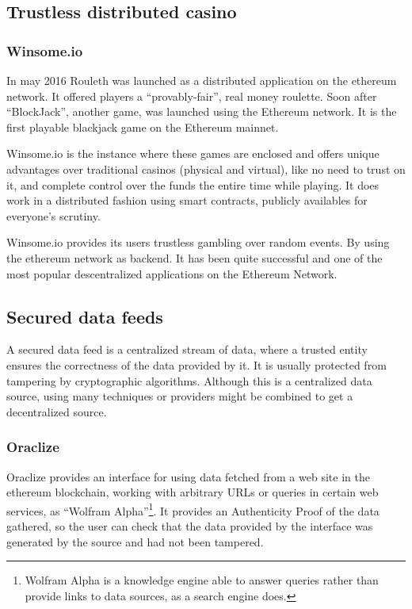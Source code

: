 \subsection{Trustless distributed casino}

\subsubsection{Winsome.io}
In may 2016 Rouleth \cite{winsomeio} was launched as a distributed application
  on the ethereum network.
It offered players a ``provably-fair'', real money roulette.
Soon after ``BlockJack'', another game,  was launched using the Ethereum
  network.
It is the first playable blackjack game on the Ethereum mainnet.

Winsome.io is the instance where these games are enclosed and offers unique
  advantages over traditional casinos (physical and virtual), like no need to
  trust on it, and complete control over the funds the entire time while
  playing.
It does work in a distributed fashion using smart contracts, publicly availables
  for everyone's scrutiny.

Winsome.io provides its users trustless gambling over random events.
By using the ethereum network as backend.
It has been quite successful and one of the most popular descentralized
  applications on the Ethereum Network.

\subsection{Secured data feeds}
A secured data feed is a centralized stream of data, where a trusted entity
  ensures the correctness of the data provided by it.
It is usually protected from tampering by cryptographic algorithms.
Although this is a centralized data source, using many techniques or providers
  might be combined to get a decentralized source.

\subsubsection{Oraclize}
Oraclize \cite{oraclizeit} provides an interface for using data fetched from a
  web site in the ethereum blockchain, working with arbitrary URLs or queries
  in certain web services, as ``Wolfram Alpha''\footnote{Wolfram Alpha is a
  knowledge engine able to answer queries rather than provide links to data
  sources, as a search engine does.}.
It provides an Authenticity Proof of the data gathered, so the user can check
  that the data provided by the interface was generated by the source and had
  not been tampered.

